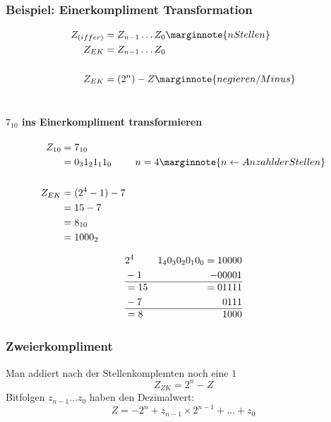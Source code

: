 \documentclass[a4paper]{scrartcl}
\begin{document}
					\subsubsection{Beispiel: Einerkompliment Transformation}
	
						\begin{align*}
							Z_{(iffer)} &= Z_{n-1} \dots Z_0 \marginnote{n Stellen} \\
							Z_{EK} &= Z_{n-1} \dots Z_0 \\
							\\
							Z_{EK} &= (2^n) - Z \marginnote{negieren/Minus}\\
							\\
						\end{align*}
					
					\paragraph{\(7_{10}\) ins Einerkompliment transformieren}
						\begin{align*}
							Z_{10} &= 7_{10}  \\
							&= 0_3 1_2 1_1 1_0 &n=4 \marginnote{n \gets Anzahl der Stellen}\\
							\\
							Z_{EK} &= (2^4 -1)-7 \\
							&= 15-7 \\
							&= 8_{10} \\
							&= 1000_2\\
						\end{align*}
	
						\begin{align*}
							&2^4 &1_4 0_3 0_2 0_1 0_0 = 10000\\
							&-1 &-00001\\
							\hline 
							&=15 &=01111\\
							&-7 &0111\\
							\hline
							&=8 &1000
						\end{align*}
					
					\subsubsection{Zweierkompliment}
					
						Man addiert nach der Stellenkomplemten noch eine \( 1 \)\\
						\[ Z_{ZK} = 2^n - Z \]
						Bitfolgen \( z_{n-1} \dots z_0 \) haben den Dezimalwert:\\
						\[ Z = - 2^n + z_{n-1} \times 2^{n-1} + \dots + z_0 \]
						
\end{document}
